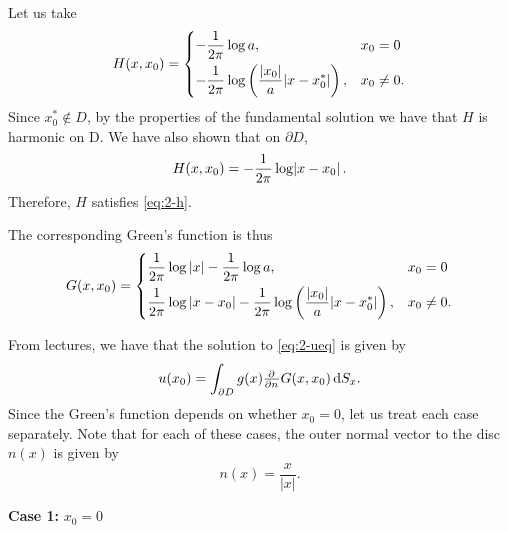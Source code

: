 \documentclass{article}
\begin{document}
Let us take
%
\begin{equation*}
    H(x, x_0) =
        \begin{dcases}
            - \frac{1}{2 \pi} \log a, &x_0 = 0 \\
            - \frac{1}{2 \pi} \log \del{\frac{|x_0|}{a} |x - x_0^*|}, &x_0 \neq 0.
        \end{dcases}
\end{equation*}
%
Since $x_0^* \notin D$, by the properties of the fundamental solution we
have that $H$ is harmonic on D. We have also shown that on $\partial D$,
%
\begin{equation*}
    H(x, x_0) = -\frac{1}{2 \pi} \log \envert{x - x_0}
    .
\end{equation*}
%
Therefore, $H$ satisfies \eqref{eq:2-h}.

The corresponding Green's function is thus
%
\begin{equation*}
    G(x, x_0) =
        \begin{dcases}
            \frac{1}{2 \pi} \log |x| - \frac{1}{2 \pi} \log a, &x_0 = 0 \\
            \frac{1}{2 \pi} \log |x - x_0| - \frac{1}{2 \pi} \log \del{\frac{|x_0|}{a} |x - x_0^*|}, &x_0 \neq 0.
        \end{dcases}
\end{equation*}

From lectures, we have that the solution to \eqref{eq:2-ueq} is given by
%
\begin{equation*}
    u(x_0) = \int_{\partial D} g(x) \pd{}{n} G(x, x_0) \dif S_x
    .
\end{equation*}
%
Since the Green's function depends on whether $x_0 = 0$, let us treat
each case separately. Note that for each of these cases, the outer
normal vector to the disc $n(x)$ is given by
%
\begin{equation*}
    n(x) = \frac{x}{|x|}
    .
\end{equation*}

\textbf{Case 1:} $x_0 = 0$
\end{document}
